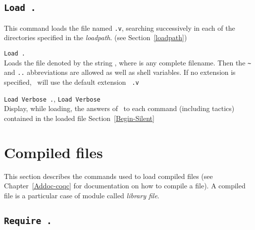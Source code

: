 \subsection[\tt Load {\ident}.]{\tt Load {\ident}.\label{Load}}
This command loads the file named {\ident}{\tt .v}, searching
successively in each of the directories specified in the {\em
  loadpath}. (see Section~\ref{loadpath})

\begin{Variants}
\item {\tt Load {\str}.}\label{Load-str}\\
  Loads the file denoted by the string {\str}, where {\str} is any
  complete filename. Then the \verb.~. and {\tt ..}
  abbreviations are allowed as well as shell variables. If no
  extension is specified, \Coq\ will use the default extension {\tt
    .v}
\item {\tt Load Verbose {\ident}.}, 
  {\tt Load Verbose {\str}}\\
  Display, while loading, the answers of \Coq\ to each command
  (including tactics) contained in the loaded file
  \SeeAlso Section~\ref{Begin-Silent}
\end{Variants}

\begin{ErrMsgs}
\item {}
\end{ErrMsgs}

\section[Compiled files]{Compiled files\label{compiled}}

This section describes the commands used to load compiled files (see
Chapter~\ref{Addoc-coqc} for documentation on how to compile a file).
A compiled file is a particular case of module called {\em library file}.


\subsection[\tt Require {\qualid}.]{\tt Require {\qualid}.\label{Require}
}

